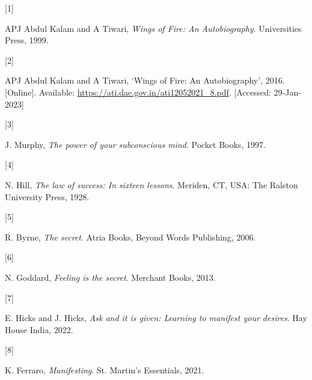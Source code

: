 \documentclass[
  a4paper,
]{article}
\newlength{\cslhangindent}
\newlength{\csllabelwidth}
\newlength{\cslentryspacingunit} %
\newenvironment{CSLReferences}[2] %
 {%
  \setlength{\parindent}{0pt}
  \ifodd #1
  \let\oldpar\par
  \def\par{\hangindent=\cslhangindent\oldpar}
  \fi
  \setlength{\parskip}{#2\cslentryspacingunit}
 }%
 {}
\newcommand{\CSLLeftMargin}[1]{\parbox[t]{\csllabelwidth}{#1}}
\newcommand{\CSLRightInline}[1]{\parbox[t]{\linewidth - \csllabelwidth}{#1}\break}
\begin{document}
\hypertarget{refs}{}
\begin{CSLReferences}{0}{0}
\leavevmode{}%
\CSLLeftMargin{{[}1{]} }%
\CSLRightInline{APJ Abdul Kalam and A Tiwari, \emph{{Wings of Fire: An
Autobiography}}. Universities Press, 1999. }

\leavevmode{}%
\CSLLeftMargin{{[}2{]} }%
\CSLRightInline{APJ Abdul Kalam and A Tiwari, {`{Wings of Fire: An
Autobiography}'}, 2016. {[}Online{]}. Available:
\url{https://ati.dae.gov.in/ati12052021_8.pdf}. {[}Accessed:
29-Jan-2023{]}}

\leavevmode{}%
\CSLLeftMargin{{[}3{]} }%
\CSLRightInline{J. Murphy, \emph{The power of your subconscious mind}.
Pocket Books, 1997. }

\leavevmode{}%
\CSLLeftMargin{{[}4{]} }%
\CSLRightInline{N. Hill, \emph{The law of success: In sixteen lessons}.
Meriden, CT, USA: The Ralston University Press, 1928. }

\leavevmode{}%
\CSLLeftMargin{{[}5{]} }%
\CSLRightInline{R. Byrne, \emph{The secret}. Atria Books, Beyond Words
Publishing, 2006. }

\leavevmode{}%
\CSLLeftMargin{{[}6{]} }%
\CSLRightInline{N. Goddard, \emph{Feeling is the secret}. Merchant
Books, 2013. }

\leavevmode{}%
\CSLLeftMargin{{[}7{]} }%
\CSLRightInline{E. Hicks and J. Hicks, \emph{Ask and it is given:
Learning to manifest your desires}. Hay House India, 2022. }

\leavevmode{}%
\CSLLeftMargin{{[}8{]} }%
\CSLRightInline{K. Ferraro, \emph{Manifesting}. St. Martin's Essentials,
2021. }

\end{CSLReferences}
\end{document}
